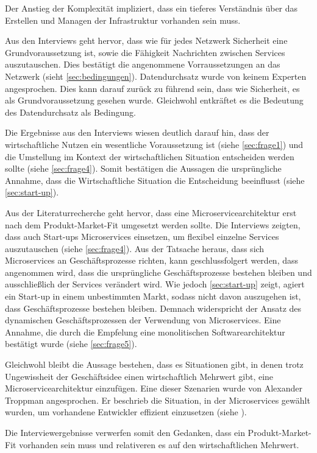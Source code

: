 Der Anstieg der Komplexität impliziert, dass ein tieferes Verständnis über das Erstellen und Managen der Infrastruktur vorhanden sein muss.

Aus den Interviews geht hervor, dass wie für jedes Netzwerk Sicherheit eine Grundvoraussetzung ist, sowie die Fähigkeit Nachrichten zwischen Services auszutauschen. Dies bestätigt die angenommene Vorraussetzungen an das Netzwerk (sieht \cref{sec:bedingungen}). Datendurchsatz wurde von keinem Experten angesprochen. Dies kann darauf zurück zu führend sein, dass wie Sicherheit, es als Grundvoraussetzung gesehen wurde. Gleichwohl entkräftet es die Bedeutung des Datendurchsatz als Bedingung.

Die Ergebnisse aus den Interviews wiesen deutlich darauf hin, dass der wirtschaftliche Nutzen ein wesentliche Voraussetzung ist (siehe \cref{sec:frage1}) und die Umstellung im Kontext der wirtschaftlichen Situation entscheiden werden sollte (siehe \cref{sec:frage4}). Somit bestätigen die Aussagen die ursprüngliche Annahme, dass die Wirtschaftliche Situation die Entscheidung beeinflusst (siehe \cref{sec:start-up}).

Aus der Literaturrecherche geht hervor, dass eine Microservicearchitektur erst nach dem Produkt-Market-Fit umgesetzt werden sollte. Die Interviews zeigten, dass auch Start-ups Microservices einsetzen, um flexibel einzelne Services auszutauschen (siehe \cref{sec:frage4}). Aus der Tatsache heraus, dass sich Microservices an Geschäftsprozesse richten, kann geschlussfolgert werden, dass angenommen wird, dass die ursprüngliche Geschäftsprozesse bestehen bleiben und ausschließlich der Services verändert wird. Wie jedoch \cref{sec:start-up} zeigt, agiert ein Start-up in einem unbestimmten Markt, sodass nicht davon auszugehen ist, dass Geschäftsprozesse bestehen bleiben. Demnach widerspricht der Ansatz des dynamischen Geschäftsprozessen der Verwendung von Microservices. Eine Annahme, die durch die Empfelung eine monolitischen Softwarearchitektur bestätigt wurde (siehe \cref{sec:frage5}).

Gleichwohl bleibt die Aussage bestehen, dass es Situationen gibt, in denen trotz Ungewissheit der Geschäftsidee einen wirtschaftlich Mehrwert gibt, eine Microservicearchitektur einzufügen. Eine dieser Szenarien wurde von Alexander Troppman angesprochen. Er beschrieb die Situation, in der Microservices gewählt wurden, um vorhandene Entwickler effizient einzusetzen (siehe ).

Die Interviewergebnisse verwerfen somit den Gedanken, dass ein Produkt-Market-Fit vorhanden sein muss und relativeren es auf den wirtschaftlichen Mehrwert.

